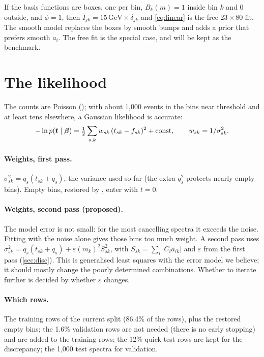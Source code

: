 If the basis functions are boxes, one per bin, $B_k(m) = 1$ inside bin $k$ and 0 outside, and
$\phi = 1$, then $I_{jk} = 15\,\text{GeV}\times\delta_{jk}$ and \cref{eq:linear} is the free
$23\times80$ fit. The smooth model replaces the boxes by smooth bumps and adds a prior that
prefers smooth $a_i$. The free fit is the special case, and will be kept as the benchmark.

\section{The likelihood}
\label{sec:likelihood}

The counts are Poisson (); with about 1,000 events in the
bins near threshold and at least tens elsewhere, a Gaussian likelihood is accurate:
\begin{equation}
  -\ln p(\boldsymbol t\mid\boldsymbol{\beta}) = \tfrac12 \sum_{s,k} w_{sk}\,(t_{sk} - f_{sk})^2 + \text{const},
  \qquad w_{sk} = 1/\sigma_{sk}^2 .
\end{equation}

\paragraph{Weights, first pass.} $\sigma_{sk}^2 = q_s(t_{sk} + q_s)$, the variance used so far
(the extra $q_s^2$ protects nearly empty bins). Empty bins, restored by
, enter with $t = 0$.

\paragraph{Weights, second pass (proposed).} The model error is not small: for the most
cancelling spectra it exceeds the noise. Fitting with the noise alone gives those bins too
much weight. A second pass uses $\sigma_{sk}^2 = q_s(t_{sk}+q_s) + \varepsilon(m_k)^2
S_{sk}^2$, with $S_{sk} = \sum_i|C_i\bar a_{ik}|$ and $\varepsilon$ from the first pass
(\cref{sec:disc}). This is generalised least squares with the error model we believe; it
should mostly change the poorly determined combinations. Whether to iterate further is
decided by whether $\varepsilon$ changes.

\paragraph{Which rows.} The training rows of the current split (86.4\% of the rows), plus the
restored empty bins; the 1.6\% validation rows are not needed (there is no early stopping)
and are added to the training rows; the 12\% quick-test rows are kept for the discrepancy;
the 1,000 test spectra for validation.

